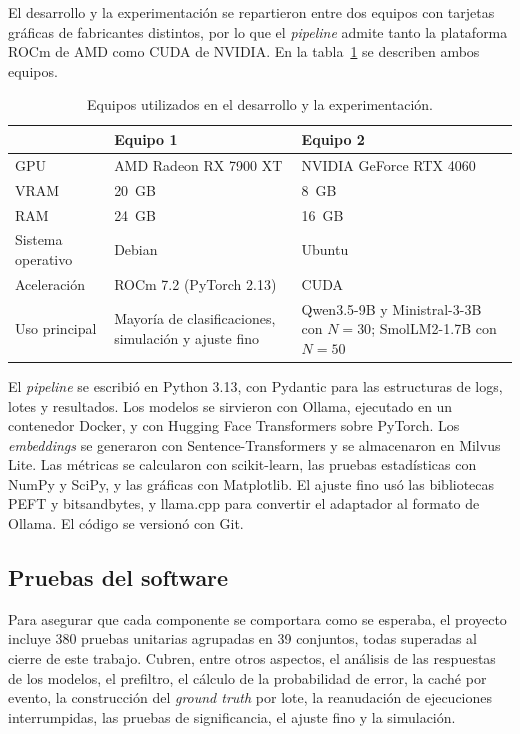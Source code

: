 El desarrollo y la experimentación se repartieron entre dos equipos con tarjetas gráficas de fabricantes distintos, por lo que el \textit{pipeline} admite tanto la plataforma ROCm de AMD como CUDA de NVIDIA. En la tabla~\ref{tab:met_equipos} se describen ambos equipos.

\begin{table}[H]
\centering
\caption{Equipos utilizados en el desarrollo y la experimentación.}
\label{tab:met_equipos}
\small
\begin{tabular}{@{}p{3cm}p{5.4cm}p{5.4cm}@{}}
\toprule
 & \textbf{Equipo 1} & \textbf{Equipo 2} \\
\midrule
GPU & AMD Radeon RX 7900 XT & NVIDIA GeForce RTX 4060 \\
VRAM & 20~GB & 8~GB \\
RAM & 24~GB & 16~GB \\
Sistema operativo & Debian & Ubuntu \\
Aceleración & ROCm 7.2 (PyTorch 2.13) & CUDA \\
Uso principal & Mayoría de clasificaciones, simulación y ajuste fino & Qwen3.5-9B y Ministral-3-3B con $N=30$; SmolLM2-1.7B con $N=50$ \\
\bottomrule
\end{tabular}
\normalsize
\end{table}

El \textit{pipeline} se escribió en Python 3.13, con Pydantic para las estructuras de logs, lotes y resultados. Los modelos se sirvieron con Ollama, ejecutado en un contenedor Docker, y con Hugging Face Transformers sobre PyTorch. Los \textit{embeddings} se generaron con Sentence-Transformers y se almacenaron en Milvus Lite. Las métricas se calcularon con scikit-learn, las pruebas estadísticas con NumPy y SciPy, y las gráficas con Matplotlib. El ajuste fino usó las bibliotecas PEFT y bitsandbytes, y llama.cpp para convertir el adaptador al formato de Ollama. El código se versionó con Git.

\subsection{Pruebas del software}\label{sec:met_pruebas}

Para asegurar que cada componente se comportara como se esperaba, el proyecto incluye 380 pruebas unitarias agrupadas en 39 conjuntos, todas superadas al cierre de este trabajo. Cubren, entre otros aspectos, el análisis de las respuestas de los modelos, el prefiltro, el cálculo de la probabilidad de error, la caché por evento, la construcción del \textit{ground truth} por lote, la reanudación de ejecuciones interrumpidas, las pruebas de significancia, el ajuste fino y la simulación.

